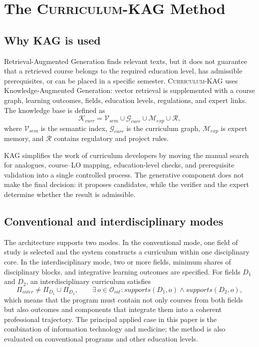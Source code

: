 \documentclass[twoside,11pt]{article}
\newcommand{\systemname}{\textsc{Curriculum-KAG}}
\begin{document}
\section{The \systemname{} Method}

\subsection{Why KAG is used}

Retrieval-Augmented Generation finds relevant texts, but it does not guarantee that a retrieved course belongs to the required education level, has admissible prerequisites, or can be placed in a specific semester. \systemname{} uses Knowledge-Augmented Generation: vector retrieval is supplemented with a course graph, learning outcomes, fields, education levels, regulations, and expert links. The knowledge base is defined as
\begin{equation}
  \mathcal{K}_{curr}=\mathcal{V}_{sem}\cup\mathcal{G}_{curr}\cup\mathcal{M}_{exp}\cup\mathcal{R},
  \label{eq:kag-knowledge-base}
\end{equation}
where $\mathcal{V}_{sem}$ is the semantic index, $\mathcal{G}_{curr}$ is the curriculum graph, $\mathcal{M}_{exp}$ is expert memory, and $\mathcal{R}$ contains regulatory and project rules.

KAG simplifies the work of curriculum developers by moving the manual search for analogues, course--LO mapping, education-level checks, and prerequisite validation into a single controlled process. The generative component does not make the final decision: it proposes candidates, while the verifier and the expert determine whether the result is admissible.

\subsection{Conventional and interdisciplinary modes}

The architecture supports two modes. In the conventional mode, one field of study is selected and the system constructs a curriculum within one disciplinary core. In the interdisciplinary mode, two or more fields, minimum shares of disciplinary blocks, and integrative learning outcomes are specified. For fields $D_1$ and $D_2$, an interdisciplinary curriculum satisfies
\begin{equation}
  \Pi_{inter}\neq \Pi_{D_1}\cup\Pi_{D_2},
  \qquad
  \exists\,o\in\mathcal{O}_{int}: supports(D_1,o)\land supports(D_2,o),
  \label{eq:interdisciplinary-not-union}
\end{equation}
which means that the program must contain not only courses from both fields but also outcomes and components that integrate them into a coherent professional trajectory. The principal applied case in this paper is the combination of information technology and medicine; the method is also evaluated on conventional programs and other education levels.
\end{document}
